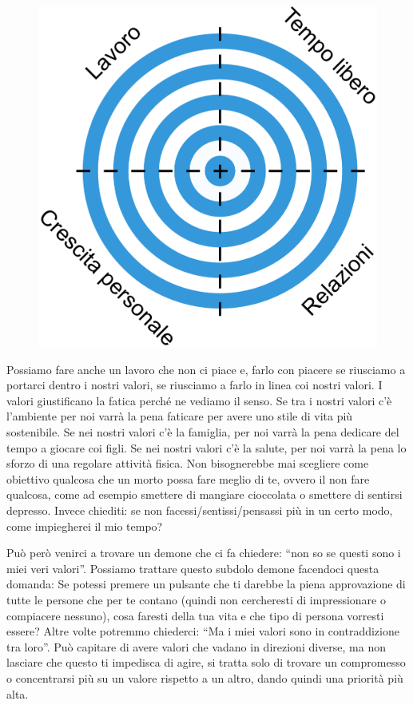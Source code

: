 \documentclass[12pt]{book} %
\begin{document}
\needspace{4cm}
\begin{figure}
  \centering
  \includegraphics[width=0.95\linewidth]{images/Libro-img014.png}
\end{figure}

Possiamo fare anche un lavoro che non ci piace e, farlo con piacere se riusciamo a portarci dentro i nostri valori, se
riusciamo a farlo in linea coi nostri valori. I valori giustificano la fatica perché ne vediamo il senso. Se tra i
nostri valori c'è l'ambiente per noi varrà la pena faticare per avere uno
stile di vita più sostenibile. Se nei nostri valori c'è la famiglia, per noi varrà la pena
dedicare del tempo a giocare coi figli. Se nei nostri valori c'è la salute, per noi varrà la pena
lo sforzo di una regolare attività fisica. Non bisognerebbe mai scegliere come obiettivo qualcosa che un morto possa
fare meglio di te, ovvero il non fare qualcosa, come ad esempio smettere di mangiare cioccolata o smettere di sentirsi
depresso. Invece chiediti: se non facessi/sentissi/pensassi più in un certo modo, come impiegherei il mio tempo?

Può però venirci a trovare un demone che ci fa chiedere: “non so se questi sono i miei veri valori”. Possiamo trattare
questo subdolo demone facendoci questa domanda: Se potessi premere un pulsante che ti darebbe la piena approvazione di
tutte le persone che per te contano (quindi non cercheresti di impressionare o compiacere nessuno), cosa faresti della
tua vita e che tipo di persona vorresti essere? Altre volte potremmo chiederci: “Ma i miei valori sono in
contraddizione tra loro”. Può capitare di avere valori che vadano in direzioni diverse, ma non lasciare che questo ti
impedisca di agire, si tratta solo di trovare un compromesso o concentrarsi più su un valore rispetto a un altro, dando
quindi una priorità più alta.
\end{document}
